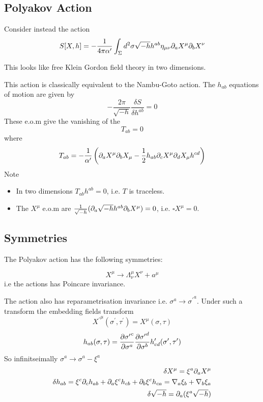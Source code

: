 \documentclass{article}
\begin{document}
\subsection{Polyakov Action}
Consider instead the action 
\[
S[X,h] = -\frac{1}{4\pi \cst} \int_\Sigma d^2\sigma \sqrt{-h} h^{ab} \eta_{\mu\nu} \del_a X^\mu \del_b X^\nu
\]
\begin{idea}
This looks like free Klein Gordon field theory in two dimensions.
\end{idea}
This action is classically equivalent to the Nambu-Goto action. The $h_{ab}$ equations of motion are given by
\[
-\frac{2\pi}{\sqrt{-h}} \frac{\delta S}{\delta h^{ab}} = 0
\]
These e.o.m give the vanishing of the  
\[
T_{ab}= 0 
\]
where
\[
T_{ab} = -\frac{1}{\cst} \left( \del_a X^\mu \del_b X_\mu - \frac{1}{2}h_{ab} \del_c X^\mu \del_d X_\mu h^{cd} \right) 
\]
Note
\begin{itemize}
    \item In two dimensions $T_{ab}h^{ab}=0$, i.e. $T$ is traceless.
    \item The $X^\mu$ e.o.m are $\frac{1}{\sqrt{-h}} ( \del_a \sqrt{-h} h^{ab} \del_b X^\mu ) =0 $, i.e. $\square X^\mu = 0$.
\end{itemize}

\subsection{Symmetries}
The Polyakov action has the following symmetries: 

\begin{definition}
\[
X^\mu \to \Lambda^\mu_\nu X^\nu + a^\mu
\]
i.e the actions has Poincare invariance. 
\end{definition}

The action also has reparametrisation invariance i.e. $\sigma^a \to {\sigma^\prime}^a$. Under such a transform the embedding fields transform 
\[
{X^\prime}^\mu(\sigma^\prime,\tau^\prime) = {X}^\mu(\sigma,\tau)
\]
\[
h_{ab}(\sigma,\tau) = \pd[{\sigma^\prime}^c]{\sigma^a} \pd[{\sigma^\prime}^d]{\sigma^b} h^\prime_{cd} (\sigma^\prime, \tau^\prime)
\]
So infinitseimally $\sigma^a \to \sigma^a - \xi^a$
\begin{align*}
    \delta X^\mu = \xi^a \del_a X^\mu \\
    \delta h_{ab} = \xi^c \del_c h_{ab} + \del_a \xi^c h_{cb} + \del_b \xi^c h_{ca} = \nabla_a\xi_b + \nabla_b \xi_a \\
    \delta \sqrt{-h} = \del_a(\xi^a \sqrt{-h})
\end{align*}
\end{document}
